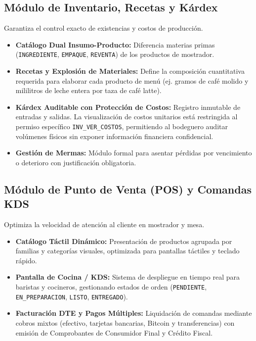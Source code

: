 \subsection{Módulo de Inventario, Recetas y Kárdex}
Garantiza el control exacto de existencias y costos de producción.
\begin{itemize}
    \item \textbf{Catálogo Dual Insumo-Producto:} Diferencia materias primas (\texttt{INGREDIENTE}, \texttt{EMPAQUE}, \texttt{REVENTA}) de los productos de mostrador.
    \item \textbf{Recetas y Explosión de Materiales:} Define la composición cuantitativa requerida para elaborar cada producto de menú (ej. gramos de café molido y mililitros de leche entera por taza de café latte).
    \item \textbf{Kárdex Auditable con Protección de Costos:} Registro inmutable de entradas y salidas. La visualización de costos unitarios está restringida al permiso específico \texttt{INV\_VER\_COSTOS}, permitiendo al bodeguero auditar volúmenes físicos sin exponer información financiera confidencial.
    \item \textbf{Gestión de Mermas:} Módulo formal para asentar pérdidas por vencimiento o deterioro con justificación obligatoria.
\end{itemize}

\subsection{Módulo de Punto de Venta (POS) y Comandas KDS}
Optimiza la velocidad de atención al cliente en mostrador y mesa.
\begin{itemize}
    \item \textbf{Catálogo Táctil Dinámico:} Presentación de productos agrupada por familias y categorías visuales, optimizada para pantallas táctiles y teclado rápido.
    \item \textbf{Pantalla de Cocina / KDS:} Sistema de despliegue en tiempo real para baristas y cocineros, gestionando estados de orden (\texttt{PENDIENTE}, \texttt{EN\_PREPARACION}, \texttt{LISTO}, \texttt{ENTREGADO}).
    \item \textbf{Facturación DTE y Pagos Múltiples:} Liquidación de comandas mediante cobros mixtos (efectivo, tarjetas bancarias, Bitcoin y transferencias) con emisión de Comprobantes de Consumidor Final y Crédito Fiscal.
\end{itemize}

